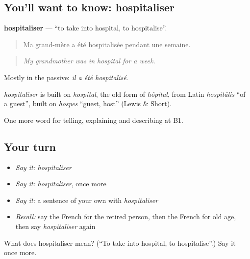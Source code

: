 \subsection*{You'll want to know: hospitaliser}
\textbf{hospitaliser} — \textquotedblleft{}to take into hospital, to hospitalise\textquotedblright{}.

\begin{quote}
Ma grand-mère a été hospitalisée pendant une semaine.
\end{quote}

\begin{quote}
\emph{My grandmother was in hospital for a week.}
\end{quote}

Mostly in the passive: \emph{il a été hospitalisé}.

\begin{cousinweb}
\emph{hospitaliser} is built on \emph{hospital}, the old form of \emph{hôpital}, from Latin \emph{hospitālis} \textquotedblleft{}of a guest\textquotedblright{}, built on \emph{hospes} \textquotedblleft{}guest, host\textquotedblright{} (Lewis \& Short).
\end{cousinweb}

\begin{grammarlens}[title={What you've built}]
One more word for telling, explaining and describing at B1.
\end{grammarlens}

\subsection*{Your turn}
\begin{itemize}
\raggedright
  \item \emph{Say it:} \emph{hospitaliser}
  \item \emph{Say it:} \emph{hospitaliser}, once more
  \item \emph{Say it:} a sentence of your own with \emph{hospitaliser}
  \item \emph{Recall:} say the French for the retired person, then the French for old age, then say \emph{hospitaliser} again
\end{itemize}

\begin{tcolorbox}[breakable,colback=teal!4,colframe=teal!35!black,title={Before you move on}]
What does hospitaliser mean? (\textquotedblleft{}To take into hospital, to hospitalise\textquotedblright{}.) Say it once more.
\end{tcolorbox}
